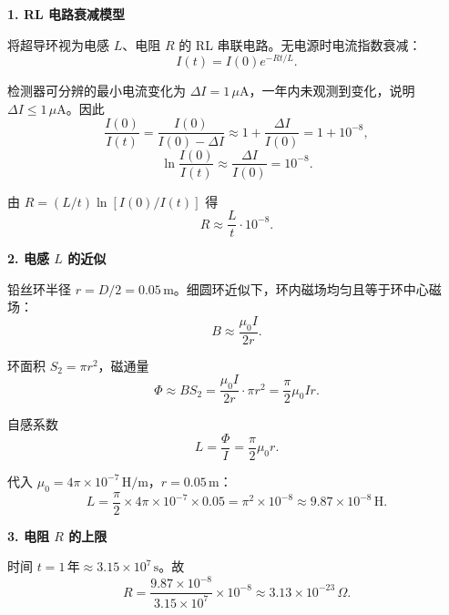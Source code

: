 \begin{derivationbox}[标准解题过程]
\textbf{1. RL 电路衰减模型}

将超导环视为电感 $L$、电阻 $R$ 的 RL 串联电路。无电源时电流指数衰减：
\begin{equation}
I(t)=I(0)e^{-Rt/L}.
\end{equation}

检测器可分辨的最小电流变化为 $\Delta I=1\,\mu\text{A}$，一年内未观测到变化，说明 $\Delta I\le1\,\mu\text{A}$。因此
\begin{equation}
\frac{I(0)}{I(t)}=\frac{I(0)}{I(0)-\Delta I}\approx1+\frac{\Delta I}{I(0)}=1+10^{-8},
\end{equation}
\begin{equation}
\ln\!\frac{I(0)}{I(t)}\approx\frac{\Delta I}{I(0)}=10^{-8}.
\end{equation}

由 $R=(L/t)\ln[I(0)/I(t)]$ 得
\begin{equation}
R\approx\frac{L}{t}\cdot10^{-8}.
\end{equation}

\textbf{2. 电感 $L$ 的近似}

铅丝环半径 $r=D/2=0.05\,\text{m}$。细圆环近似下，环内磁场均匀且等于环中心磁场：
\begin{equation}
B\approx\frac{\mu_0I}{2r}.
\end{equation}

环面积 $S_2=\pi r^2$，磁通量
\begin{equation}
\Phi\approx BS_2=\frac{\mu_0I}{2r}\cdot\pi r^2=\frac{\pi}{2}\mu_0Ir.
\end{equation}

自感系数
\begin{equation}
L=\frac{\Phi}{I}=\frac{\pi}{2}\mu_0r.
\end{equation}

代入 $\mu_0=4\pi\times10^{-7}\,\text{H/m}$，$r=0.05\,\text{m}$：
\begin{equation}
L=\frac{\pi}{2}\times4\pi\times10^{-7}\times0.05=\pi^2\times10^{-8}\approx9.87\times10^{-8}\,\text{H}.
\end{equation}

\textbf{3. 电阻 $R$ 的上限}

时间 $t=1\,\text{年}\approx3.15\times10^7\,\text{s}$。故
\begin{equation}
R=\frac{9.87\times10^{-8}}{3.15\times10^7}\times10^{-8}\approx3.13\times10^{-23}\,\Omega.
\end{equation}


\end{derivationbox}

